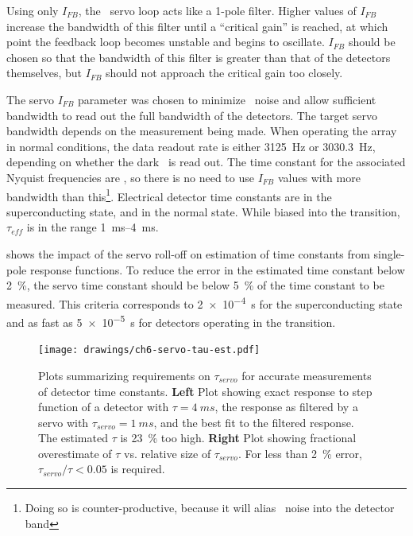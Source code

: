 Using only $I_{FB}$, the \MCE\ servo loop acts like a 1-pole filter.
Higher values of $I_{FB}$ increase the bandwidth of this filter until a ``critical gain'' is reached, at which point the feedback loop becomes unstable and begins to oscillate.
$I_{FB}$ should be chosen so that the bandwidth of this filter is greater than that of the detectors themselves, but $I_{FB}$ should not approach the critical gain too closely.

The servo $I_{FB}$ parameter was chosen to minimize \SQUID\ noise and allow sufficient bandwidth to read out the full bandwidth of the detectors.
The target servo bandwidth depends on the measurement being made.
When operating the array in normal conditions, the data readout rate is either \SI{3125}{Hz} or \SI{3030.3}{Hz}, depending on whether the dark \SQUID\ is read out.
The time constant for the associated Nyquist frequencies are , so there is no need to use $I_{FB}$ values with more bandwidth than this\footnote{Doing so is counter-productive, because it will alias \SQUID\ noise into the detector band}.
Electrical detector time constants are  in the superconducting state, and  in the normal state.
While biased into the transition, $\tau_{eff}$ is in the range \SIrange{1}{4}{ms}.

 shows the impact of the servo roll-off on estimation of time constants from single-pole response functions.
To reduce the error in the estimated time constant below \SI{2}{\percent}, the servo time constant should be below \SI{5}{\percent} of the time constant to be measured.
This criteria corresponds to \SI{2e-4}{s} for the superconducting state and as fast as \SI{5e-5}{s} for detectors operating in the transition.

\begin{figure}
\texttt{[image: drawings/ch6-servo-tau-est.pdf]}
\caption[Required $\tau_{servo}$]{
Plots summarizing requirements on $\tau_{servo}$ for accurate measurements of detector time constants.
\textbf{Left} Plot showing exact response to step function of a detector with $\tau = \SI{4}{ms}$, the response as filtered by a servo with $\tau_{servo} = \SI{1}{ms}$, and the best fit to the filtered response. The estimated $\tau$ is \SI{23}{\percent} too high.
\textbf{Right} Plot showing fractional overestimate of $\tau$ vs. relative size of $\tau_{servo}$.
For less than \SI{2}{\percent} error, $\tau_{servo}/\tau < \num{0.05}$ is required.
}
\label{fig:ch6-servo-tau-est}
\end{figure}

